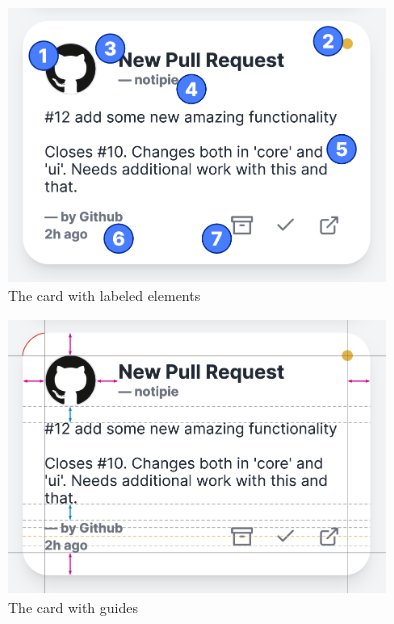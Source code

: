 \begin{figure}[p]
      \centering
      \includegraphics[width=10cm,keepaspectratio]{img/card_labeled.png}
      \caption{The card with labeled elements}
      \label{fig:card-with-labeled-elements}
\end{figure}

\begin{figure}[p]
      \centering
      \includegraphics[width=10cm,keepaspectratio]{img/card_guides.png}
      \caption{The card with guides}
      \label{fig:card-with-guides}
\end{figure}
